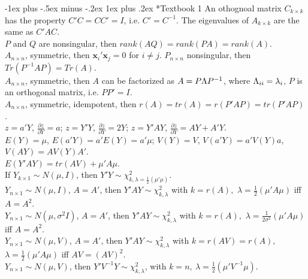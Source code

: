 \documentclass[10pt,landscape]{article}
\makeatletter
\renewcommand{\subsubsection}{\@startsection{subsubsection}{3}{0mm}%
                                {-1ex plus -.5ex minus -.2ex}%
                                {1ex plus .2ex}%
                                {\normalfont\small\bfseries}}
\makeatother
\begin{document}
\begin{multicols}{3}
\subsubsection*{Textbook 1}
An othognoal matrix $C_{k\times k}$ has the property $C'C=CC'=I$, i.e. $C'=C^{-1}$. The eigenvalues of $A_{k\times k}$ are the same as $C'AC$. \\
$P$ and $Q$ are nonsingular, then $rank\left(AQ\right)=rank\left(PA\right)=rank\left(A\right)$. \\
$A{}_{n\times n}$, symmetric, then $\textbf{x}_{i}'\textbf{x}_{j}=0$ for $i\ne j$. $P_{n\times n}$ nonsingular, then $Tr\left(P^{-1}AP\right)=Tr\left(A\right)$. \\
$A{}_{n\times n}$, symmetric, then $A$ can be factorized as $A=P\textbf{\ensuremath{\Lambda}}P^{-1}$, where $\textbf{\ensuremath{\Lambda}}_{ii}=\lambda_{i}$, $P$ is an orthogonal matrix, i.e. $PP'=I$.\\
$A{}_{n\times n}$, symmetric, idempotent, then $r\left(A\right)=tr\left(A\right)=r\left(P'AP\right)=tr\left(P'AP\right)$. \\
$z=a'Y$, $\frac{\partial z}{\partial Y}=a$; $z=Y'Y$, $\frac{\partial z}{\partial Y}=2Y$; $z=Y'AY$, $\frac{\partial z}{\partial Y}=AY+A'Y$.\\
$E\left(Y\right)=\mu$, $E\left(a'Y\right)=a'E\left(Y\right)=a'\mu$; $V\left(Y\right)=V$, $V\left(a'Y\right)=a'V\left(Y\right)a$, $V\left(AY\right)=AV\left(Y\right)A'$.\\
$E\left(Y'AY\right)=tr\left(AV\right)+\mu'A\mu$.\\
If $Y_{k\times1}\sim N\left(\mu,I\right)$, then $Y'Y\sim\chi_{k,\lambda=\frac{1}{2}\left(\mu'\mu\right)}^{2}$.\\
$Y_{n\times1}\sim N\left(\mu,I\right)$, $A=A'$, then $Y'AY\sim\chi_{k,\lambda}^{2}$ with $k=r\left(A\right),$ $\lambda=\frac{1}{2}\left(\mu'A\mu\right)$ iff $A=A^{2}$.\\
$Y_{n\times1}\sim N\left(\mu,\sigma^{2}I\right)$, $A=A'$, then $Y'AY\sim\chi_{k,\lambda}^{2}$ with $k=r\left(A\right),$ $\lambda=\frac{1}{2\sigma^{2}}\left(\mu'A\mu\right)$ iff $A=A^{2}$.\\
$Y_{n\times1}\sim N\left(\mu,V\right)$, $A=A'$, then $Y'AY\sim\chi_{k,\lambda}^{2}$ with $k=r\left(AV\right)=r\left(A\right),$ $\lambda=\frac{1}{2}\left(\mu'A\mu\right)$ iff $AV=\left(AV\right)^{2}$.\\
$Y_{n\times1}\sim N\left(\mu,V\right)$, then $Y'V^{-1}Y\sim\chi_{k,\lambda}^{2}$, with $k=n,\ \lambda=\frac{1}{2}\left(\mu'V^{-1}\mu\right)$.\\

\end{multicols}
\end{document}
